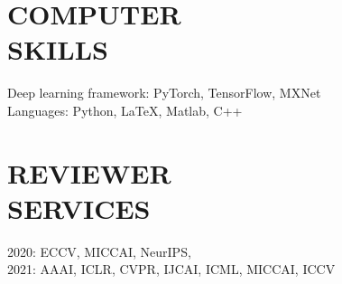 \documentclass[margin]{res}
\begin{document}
\begin{resume}



\vspace{-1em}
\section{COMPUTER \\ SKILLS} 
                Deep learning framework: PyTorch, TensorFlow, MXNet\\
                Languages: Python, \LaTeX, Matlab, C++

\vspace{-1em}
\section{REVIEWER \\ SERVICES}
                2020: ECCV, MICCAI, NeurIPS,\\ 2021: AAAI, ICLR, CVPR, IJCAI, ICML, MICCAI, ICCV

\end{resume}
\end{document}
